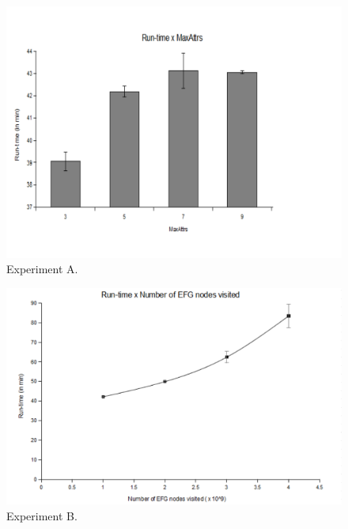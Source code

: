 \begin{figure}[h!]
\centering
    \includegraphics[scale=0.25]{figures/plot2.pdf}
    \caption{Experiment A.}
    \label{fig:Plot2}  
\end{figure}

\begin{figure}[h!]
\centering
    \includegraphics[scale=0.4]{figures/plot1.pdf}
    \caption{Experiment B.}
    \label{fig:Plot1}  
\end{figure}

